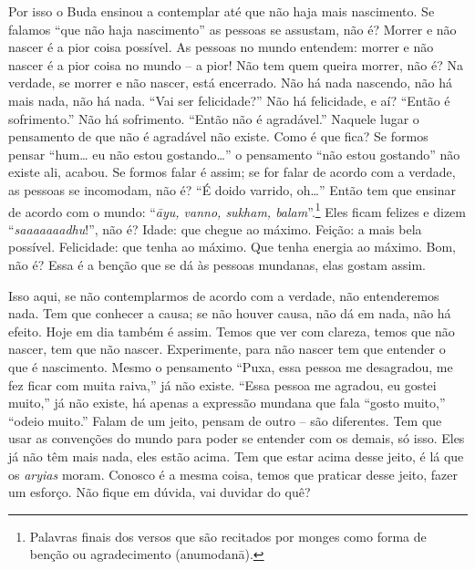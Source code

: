 Por isso o Buda ensinou a contemplar até que não haja mais
nascimento. Se falamos “que não haja nascimento” as pessoas se
assustam, não é? Morrer e não nascer é a pior coisa possível. As
pessoas no mundo entendem: morrer e não nascer é a pior coisa no mundo
– a pior! Não tem quem queira morrer, não é? Na verdade, se morrer e
não nascer, está encerrado. Não há nada nascendo, não há mais nada, não
há nada. “Vai ser felicidade?” Não há felicidade, e aí? “Então é
sofrimento.” Não há sofrimento. “Então não é agradável.” Naquele lugar
o pensamento de que não é agradável não existe. Como é que fica? Se
formos pensar “hum\ldots{} eu não estou gostando\ldots{}” o pensamento “não estou
gostando” não existe ali, acabou. Se formos falar é assim; se for falar
de acordo com a verdade, as pessoas se incomodam, não é? “É doido
varrido, oh\ldots{}” Então tem que ensinar de acordo com o mundo:
“\textit{āyu, vanno, sukham, balam}”.\footnote{Palavras finais dos
versos que são recitados por monges como forma de benção ou
agradecimento (anumodanā).} Eles ficam felizes e dizem
“\textit{saaaaaaadhu}!”, não é? Idade: que chegue ao máximo. Feição: a
mais bela possível. Felicidade: que tenha ao máximo. Que tenha energia
ao máximo. Bom, não é? Essa é a benção que se dá às pessoas mundanas,
elas gostam assim. 

Isso aqui, se não contemplarmos de acordo com a verdade, não
entenderemos nada. Tem que conhecer a causa; se não houver causa, não
dá em nada, não há efeito. Hoje em dia também é assim. Temos que ver
com clareza, temos que não nascer, tem que não nascer. Experimente,
para não nascer tem que entender o que é nascimento. Mesmo o pensamento
“Puxa, essa pessoa me desagradou, me fez ficar com muita raiva,” já não
existe. “Essa pessoa me agradou, eu gostei muito,” já não existe, há
apenas a expressão mundana que fala “gosto muito,” “odeio muito.” Falam
de um jeito, pensam de outro – são diferentes. Tem que usar as
convenções do mundo para poder se entender com os demais, só isso. Eles
já não têm mais nada, eles estão acima. Tem que estar acima desse
jeito, é lá que os \textit{aryias} moram. Conosco é a mesma coisa,
temos que praticar desse jeito, fazer um esforço. Não fique em dúvida,
vai duvidar do quê? 

